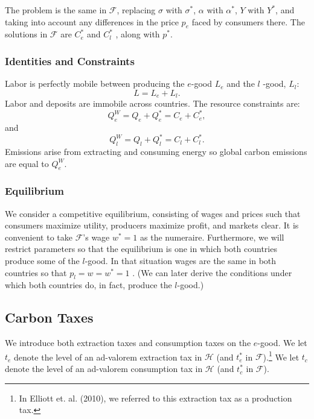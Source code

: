 \documentclass[notitlepage,12pt]{article}
\begin{document}
The problem is the same in $\mathcal{F}$, replacing $\sigma $ with $\sigma
^{\ast }$, $\alpha $ with $\alpha ^{\ast }$, $Y$ with $Y^{\ast }$, and
taking into account any differences in the price $p_{e}$ faced by consumers
there. The solutions in $\mathcal{F}$ are $C_{e}^{\ast }$ and $C_{l}^{\ast }$%
, along with $p^{\ast }$.

\subsubsection{Identities and Constraints}

Labor is perfectly mobile between producing the $e$-good $L_{e}$ and the $l$%
-good, $L_{l}$:%
\begin{equation*}
L=L_{e}+L_{l}.
\end{equation*}%
Labor and deposits are immobile across countries. The resource constraints
are:%
\begin{equation*}
Q_{e}^{W}=Q_{e}+Q_{e}^{\ast }=C_{e}+C_{e}^{\ast },
\end{equation*}%
and%
\begin{equation*}
Q_{l}^{W}=Q_{l}+Q_{l}^{\ast }=C_{l}+C_{l}^{\ast }.
\end{equation*}%
Emissions arise from extracting and consuming energy so global carbon
emissions are equal to $Q_{e}^{W}$.

\subsubsection{Equilibrium}

We consider a competitive equilibrium, consisting of wages and prices such
that consumers maximize utility, producers maximize profit, and markets
clear. It is convenient to take $\mathcal{F}$'s wage $w^{\ast }=1$ as the
numeraire. Furthermore, we will restrict parameters so that the equilibrium
is one in which both countries produce some of the $l$-good. In that
situation wages are the same in both countries so that $p_{l}=w=w^{\ast }=1$%
. (We can later derive the conditions under which both countries do, in
fact, produce the $l$-good.)

\subsection{Carbon Taxes}

We introduce both extraction taxes and consumption taxes on the $e$-good. We
let $t_{e}$ denote the level of an ad-valorem extraction tax in $\mathcal{H}$
(and $t_{e}^{\ast }$ in $\mathcal{F}$).\footnote{%
In Elliott et. al. (2010), we referred to this extraction tax as a
production tax.} We let $t_{c}$ denote the level of an ad-valorem
consumption tax in $\mathcal{H}$ (and $t_{c}^{\ast }$ in $\mathcal{F}$).
\end{document}
